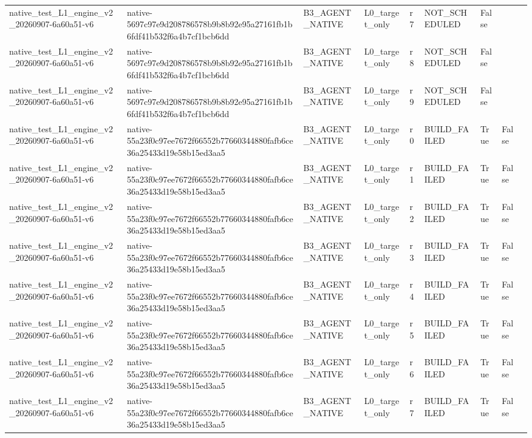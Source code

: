 \begin{tabular}{lllllllll}
native\_test\_L1\_engine\_v2\_20260907-6a60a51-v6 & native-5697c97e9d208786578b9b8b92e95a27161fb1b6fdf41b532f6a4b7cf1bcb6dd & B3\_AGENT\_NATIVE & L0\_target\_only & r7 & NOT\_SCHEDULED & False &  &  \\
native\_test\_L1\_engine\_v2\_20260907-6a60a51-v6 & native-5697c97e9d208786578b9b8b92e95a27161fb1b6fdf41b532f6a4b7cf1bcb6dd & B3\_AGENT\_NATIVE & L0\_target\_only & r8 & NOT\_SCHEDULED & False &  &  \\
native\_test\_L1\_engine\_v2\_20260907-6a60a51-v6 & native-5697c97e9d208786578b9b8b92e95a27161fb1b6fdf41b532f6a4b7cf1bcb6dd & B3\_AGENT\_NATIVE & L0\_target\_only & r9 & NOT\_SCHEDULED & False &  &  \\
native\_test\_L1\_engine\_v2\_20260907-6a60a51-v6 & native-55a23f0c97ee7672f66552b77660344880fafb6ce36a25433d19e58b15ed3aa5 & B3\_AGENT\_NATIVE & L0\_target\_only & r0 & BUILD\_FAILED & True & False &  \\
native\_test\_L1\_engine\_v2\_20260907-6a60a51-v6 & native-55a23f0c97ee7672f66552b77660344880fafb6ce36a25433d19e58b15ed3aa5 & B3\_AGENT\_NATIVE & L0\_target\_only & r1 & BUILD\_FAILED & True & False &  \\
native\_test\_L1\_engine\_v2\_20260907-6a60a51-v6 & native-55a23f0c97ee7672f66552b77660344880fafb6ce36a25433d19e58b15ed3aa5 & B3\_AGENT\_NATIVE & L0\_target\_only & r2 & BUILD\_FAILED & True & False &  \\
native\_test\_L1\_engine\_v2\_20260907-6a60a51-v6 & native-55a23f0c97ee7672f66552b77660344880fafb6ce36a25433d19e58b15ed3aa5 & B3\_AGENT\_NATIVE & L0\_target\_only & r3 & BUILD\_FAILED & True & False &  \\
native\_test\_L1\_engine\_v2\_20260907-6a60a51-v6 & native-55a23f0c97ee7672f66552b77660344880fafb6ce36a25433d19e58b15ed3aa5 & B3\_AGENT\_NATIVE & L0\_target\_only & r4 & BUILD\_FAILED & True & False &  \\
native\_test\_L1\_engine\_v2\_20260907-6a60a51-v6 & native-55a23f0c97ee7672f66552b77660344880fafb6ce36a25433d19e58b15ed3aa5 & B3\_AGENT\_NATIVE & L0\_target\_only & r5 & BUILD\_FAILED & True & False &  \\
native\_test\_L1\_engine\_v2\_20260907-6a60a51-v6 & native-55a23f0c97ee7672f66552b77660344880fafb6ce36a25433d19e58b15ed3aa5 & B3\_AGENT\_NATIVE & L0\_target\_only & r6 & BUILD\_FAILED & True & False &  \\
native\_test\_L1\_engine\_v2\_20260907-6a60a51-v6 & native-55a23f0c97ee7672f66552b77660344880fafb6ce36a25433d19e58b15ed3aa5 & B3\_AGENT\_NATIVE & L0\_target\_only & r7 & BUILD\_FAILED & True & False &  \\

\end{tabular}
